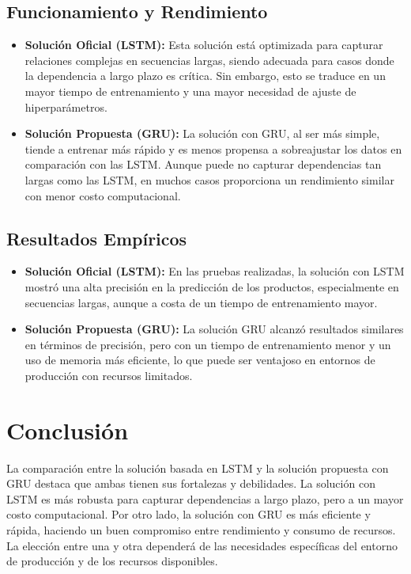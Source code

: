 \documentclass[runningheads]{llncs}
\begin{document}
\subsection{Funcionamiento y Rendimiento}

\begin{itemize}
    \item \textbf{Solución Oficial (LSTM):} Esta solución está optimizada para capturar relaciones complejas en secuencias largas, siendo adecuada para casos donde la dependencia a largo plazo es crítica. Sin embargo, esto se traduce en un mayor tiempo de entrenamiento y una mayor necesidad de ajuste de hiperparámetros.
    
    \item \textbf{Solución Propuesta (GRU):} La solución con GRU, al ser más simple, tiende a entrenar más rápido y es menos propensa a sobreajustar los datos en comparación con las LSTM. Aunque puede no capturar dependencias tan largas como las LSTM, en muchos casos proporciona un rendimiento similar con menor costo computacional.
\end{itemize}

\subsection{Resultados Empíricos}

\begin{itemize}
    \item \textbf{Solución Oficial (LSTM):} En las pruebas realizadas, la solución con LSTM mostró una alta precisión en la predicción de los productos, especialmente en secuencias largas, aunque a costa de un tiempo de entrenamiento mayor.
    
    \item \textbf{Solución Propuesta (GRU):} La solución GRU alcanzó resultados similares en términos de precisión, pero con un tiempo de entrenamiento menor y un uso de memoria más eficiente, lo que puede ser ventajoso en entornos de producción con recursos limitados.
\end{itemize}

\section{Conclusión}

La comparación entre la solución basada en LSTM y la solución propuesta con GRU destaca que ambas tienen sus fortalezas y debilidades. La solución con LSTM es más robusta para capturar dependencias a largo plazo, pero a un mayor costo computacional. Por otro lado, la solución con GRU es más eficiente y rápida, haciendo un buen compromiso entre rendimiento y consumo de recursos. La elección entre una y otra dependerá de las necesidades específicas del entorno de producción y de los recursos disponibles.
\end{document}
